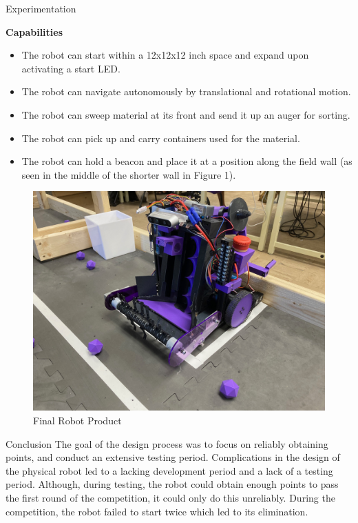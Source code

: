 \documentclass[final]{beamer}
\newlength{\colwidth}
\begin{document}
\begin{frame}[t]
\begin{columns}[t]
\begin{column}{\colwidth}
    \begin{block}{Experimentation}
    \item \textbf{Capabilities}
        \begin{itemize}
          \item The robot can start within a 12x12x12 inch space and expand upon activating a start LED.
          \item The robot can navigate autonomously by translational and rotational motion.
          \item The robot can sweep material at its front and send it up an auger for sorting.
          \item The robot can pick up and carry containers used for the material.
          \item The robot can hold a beacon and place it at a position along the field wall (as seen in the middle of the shorter wall in Figure 1).
        \end{itemize}

    \begin{figure}
      \centering
      \includegraphics[width=20.0cm]{Robot_Practice_Field.jpg}
      \caption{Final Robot Product}
    \end{figure}

  \end{block}


  \begin{block}{Conclusion}
    The goal of the design process was to focus on reliably obtaining points, and conduct an extensive testing period. Complications in the design of the physical robot led to a lacking development period and a lack of a testing period. Although, during testing, the robot could obtain enough points to pass the first round of the competition, it could only do this unreliably. During the competition, the robot failed to start twice which led to its elimination.


\end{block}
\end{column}
\end{columns}
\end{frame}
\end{document}

